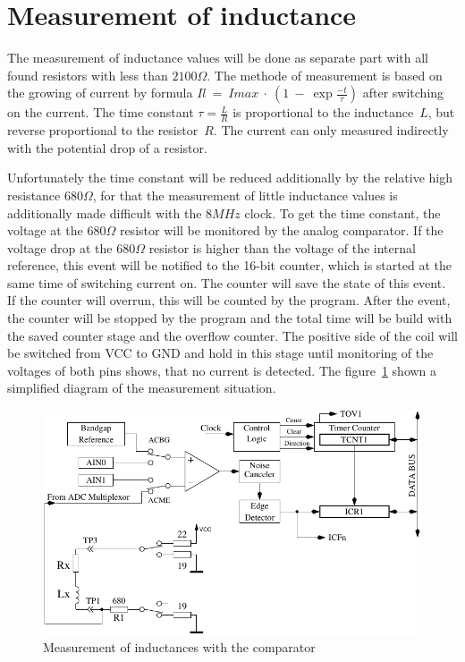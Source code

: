 \section{Measurement of inductance}
The measurement of inductance values will be done as separate part with all found resistors with
less than \(2100\Omega\).
The methode of measurement is based on the growing of current by formula \(Il~=~Imax~\cdot~(1~-~\exp{\frac{-t}{\tau}})\) 
after switching on the current.
The time constant \(\tau = \frac{L}{R}\) is proportional to the inductance~\(L\), but reverse proportional to the
resistor~\(R\). 
The current can only measured indirectly with the potential drop of a resistor.

Unfortunately the time constant will be reduced additionally by the relative high resistance \(680\Omega\),
for that the measurement of little inductance values is additionally made difficult with the \(8MHz\) clock.
To get the time constant, the voltage at the \(680\Omega\) resistor will be monitored by the analog
comparator.
If the voltage drop at the \(680\Omega\) resistor is higher than the voltage of the internal reference, this
event will be notified to the 16-bit counter, which is started at the same time of switching current on.
The counter will save the state of this event.
If the counter will overrun, this will be counted by the program.
After the event, the counter will be stopped by the program and the total time will be build with the saved
counter stage and the overflow counter.
The positive side of the coil will be switched from VCC to GND and hold in this stage until  monitoring 
of the voltages of both pins shows, that no current is detected.
The figure~\ref{fig:Inductance} shown a simplified diagram of the measurement situation.

\begin{figure}[H]
\centering
\includegraphics[]{../FIG/Inductance.pdf}
\caption{Measurement of inductances with the comparator}
\label{fig:Inductance}
\end{figure}

